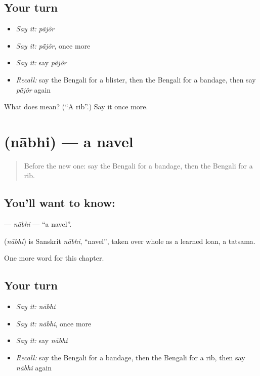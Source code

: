 \subsection*{Your turn}
\begin{itemize}
\raggedright
  \item \emph{Say it:} \emph{pā̃jôr}
  \item \emph{Say it:} \emph{pā̃jôr}, once more
  \item \emph{Say it:} say \emph{pā̃jôr}
  \item \emph{Recall:} say the Bengali for a blister, then the Bengali for a bandage, then say \emph{pā̃jôr} again
\end{itemize}

\begin{tcolorbox}[breakable,colback=teal!4,colframe=teal!35!black,title={Before you move on}]
What does  mean? (\textquotedblleft{}A rib\textquotedblright{}.) Say it once more.
\end{tcolorbox}
\section[\texorpdfstring{\bn{নাভি} (nābhi)}{নাভি (nābhi)}]{ (nābhi) — a navel}

\label{lesson:BN-C186-nabhi}



\begin{quote}
Before the new one: say the Bengali for a bandage, then the Bengali for a rib.
\end{quote}

\subsection*{You'll want to know: }
\textbf{} — \emph{nābhi} — \textquotedblleft{}a navel\textquotedblright{}.

\begin{cousinweb}
\textbf{} (\emph{nābhi}) is Sanskrit \emph{nābhi}, \textquotedblleft{}navel\textquotedblright{}, taken over whole as a learned loan, a tatsama.
\end{cousinweb}

\begin{grammarlens}[title={What you've built}]
One more word for this chapter.
\end{grammarlens}

\subsection*{Your turn}
\begin{itemize}
\raggedright
  \item \emph{Say it:} \emph{nābhi}
  \item \emph{Say it:} \emph{nābhi}, once more
  \item \emph{Say it:} say \emph{nābhi}
  \item \emph{Recall:} say the Bengali for a bandage, then the Bengali for a rib, then say \emph{nābhi} again
\end{itemize}

